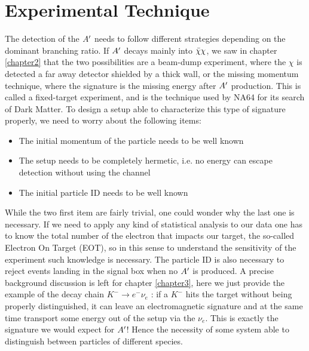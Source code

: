 \section{Experimental Technique}
\label{ch2:sec:experimental-technique}

The detection of the $A'$ needs to follow different strategies depending on the dominant branching ratio. If $A'$ decays mainly into $\bar{\chi} \chi$, we saw in chapter \ref{chapter2} that the two possibilities are a beam-dump experiment, where the $\chi$ is detected a far away detector shielded by a thick wall, or the missing momentum technique, where the signature is the missing energy after $A'$ production. This is called a fixed-target experiment, and is the technique used by NA64 for its search of Dark Matter. To design a setup able to characterize this type of signature properly, we need to worry about the following items:

\begin{itemize}
\item The initial momentum of the particle needs to be well known
\item The setup needs to be completely hermetic, i.e. no energy can escape detection without using the channel 
\item The initial particle ID needs to be well known
\end{itemize}

While the two first item are fairly trivial, one could wonder why the last one is necessary. If we need to apply any kind of statistical analysis to our data one has to know the total number of the electron that impacts our target, the so-called Electron On Target (EOT), so in this sense to understand the sensitivity of the experiment such knowledge is necessary. The particle ID is also necessary to reject events landing in the signal box when no $A'$ is produced. A precise background discussion is left for chapter \ref{chapter3}, here we just provide the example of the decay chain $K^- \to e^- \nu_e$ \cite{review-particle-physics}: if a $K^-$ hits the target without being properly distinguished, it can leave an electromagnetic signature and at the same time transport some energy out of the setup via the $\nu_e$. This is exactly the signature we would expect for $A'$! Hence the necessity of some system able to distinguish between particles of different species.

